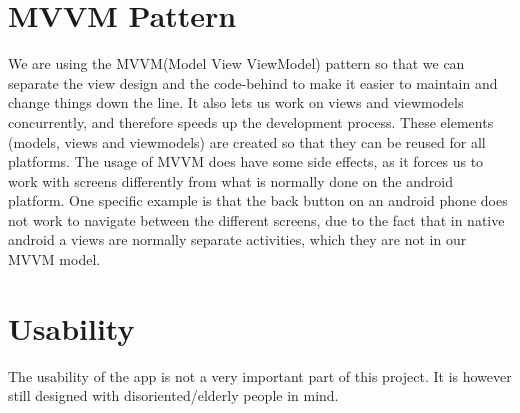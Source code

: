\section{MVVM Pattern}
We are using the MVVM(Model View ViewModel) pattern so that we can separate the view design and the code-behind to make it easier to maintain and change things down the line. It also lets us work on views and viewmodels concurrently, and therefore speeds up the development process. These elements (models, views and viewmodels) are created so that they can be reused for all platforms. The usage of MVVM does have some side effects, as it forces us to work with screens differently from what is normally done on the android platform. One specific example is that the back button on an android phone does not work to navigate between the different screens, due to the fact that in native android a views are normally separate activities, which they are not in our MVVM model.



\section{Usability}
The usability of the app is not a very important part of this project. It is however still designed with disoriented/elderly people in mind. 

